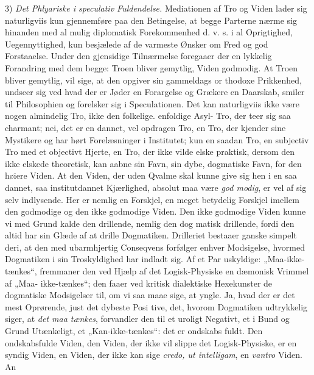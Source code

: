 \documentclass[12pt]{book}
\newcommand{\opage}[1]{\marginnote{\footnotesize\textit{[#1]}}}
\begin{document}
3) \emph{Det Phlyariske i speculativ Fuldendelse.}
Mediationen af Tro og Viden lader sig naturligviis kun
gjennemføre paa den Betingelse, at begge Parterne nærme sig
hinanden med al mulig diplomatisk Forekommenhed d. v. s. i
al Oprigtighed, Uegennyttighed, kun besjælede af de varmeste
Ønsker om Fred og god Forstaaelse. Under den gjensidige
Tilnærmelse foregaaer der en lykkelig Forandring med dem
begge: Troen bliver gemytlig, Viden godmodig. At Troen
bliver gemytlig, vil sige, at den opgiver sin gammeldags or\-%
thodoxe Prikkenhed, undseer sig ved hvad der er Jøder en
Forargelse og Grækere en Daarskab, smiler til Philosophien
og forelsker sig i Speculationen. Det kan naturligviis ikke
\opage{94}\setcounter{footnote}{0}%
være nogen almindelig Tro, ikke den folkelige. enfoldige Asyl-%
Tro, der teer sig saa charmant; nei, det er en dannet, vel\-%
opdragen Tro, en Tro, der kjender sine Mystikere og har hørt
Forelæsninger i Institutet; kun en saadan Tro, en subjectiv
Tro med et objectivt Hjerte, en Tro, der ikke vilde elske
praktisk, dersom den ikke elskede theoretisk, kan aabne sin Favn,
sin dybe, dogmatiske Favn, for den høiere Viden. At den
Viden, der uden Qvalme skal kunne give sig hen i en saa
dannet, saa institutdannet Kjærlighed, absolut maa være \emph{god\-%
modig}, er vel af sig selv indlysende. Her er nemlig en
Forskjel, en meget betydelig Forskjel imellem den godmodige
og den ikke godmodige Viden. Den ikke godmodige Viden
kunne vi med Grund kalde den drillende, nemlig den dog\-%
matisk drillende, fordi den altid har sin Glæde af at drille
Dogmatiken. Drilleriet bestaaer ganske simpelt deri, at den
med ubarmhjertig Conseqvens forfølger enhver Modsigelse,
hvormed Dogmatiken i sin Troskyldighed har indladt sig. Af
et Par uskyldige: „Maa-ikke-tænkes“, fremmaner den ved
Hjælp af det Logisk-Physiske en dæmonisk Vrimmel af „Maa-%
ikke-tænkes“; den faaer ved kritisk dialektiske Hexekunster de
dogmatiske Modsigelser til, om vi saa maae sige, at yngle.
Ja, hvad der er det mest Oprørende, just det dybeste Posi\-%
tive, det, hvorom Dogmatiken udtrykkelig siger, at \emph{det maa
tænkes}, forvandler den til et uroligt Negativt, et i Bund
og Grund Utænkeligt, et „Kan-ikke-tænkes“: det er ondskabs\-%
fuldt. Den ondskabsfulde Viden, den Viden, der ikke vil
slippe det Logisk-Physiske, er en syndig Viden, en Viden, der
ikke kan sige \textit{credo, ut intelligam}, en \emph{vantro} Viden. An\-%
\end{document}
